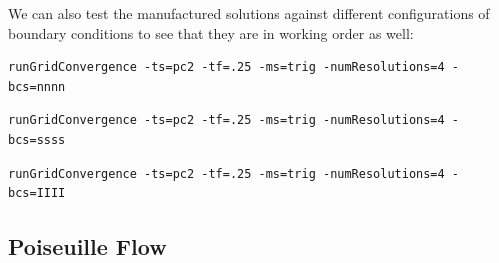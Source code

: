 \newpage

We can also test the manufactured solutions against different configurations of boundary conditions to see that they are in working order as well:

\begin{table}[h!]
\footnotesize
\begin{center}

\begin{Verbatim}[fontsize=\small]
runGridConvergence -ts=pc2 -tf=.25 -ms=trig -numResolutions=4 -bcs=nnnn
\end{Verbatim}



\vspace{2em}

\begin{Verbatim}[fontsize=\small]
runGridConvergence -ts=pc2 -tf=.25 -ms=trig -numResolutions=4 -bcs=ssss
\end{Verbatim}


\vspace{2em}

\begin{Verbatim}[fontsize=\small]
runGridConvergence -ts=pc2 -tf=.25 -ms=trig -numResolutions=4 -bcs=IIII
\end{Verbatim}

\end{center}
\end{table}



\clearpage
\subsection{Poiseuille Flow} \label{sec:poiseuille_flow}

